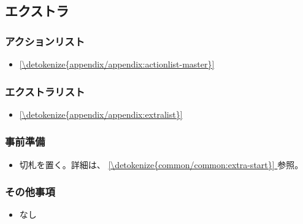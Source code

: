\documentclass[letterpaper,10pt,dvipdfmx]{sphinxmanual}
\begin{document}
\subsection{エクストラ}
\label{\detokenize{format/extra:format-extra}}\label{\detokenize{format/extra:id1}}\label{\detokenize{format/extra::doc}}

\subsubsection{アクションリスト}
\label{\detokenize{format/extra:id2}}\begin{itemize}
\item {} 
\sphinxAtStartPar
\hyperref[\detokenize{appendix/appendix:actionlist-master}]{\ref{\detokenize{appendix/appendix:actionlist-master}} }

\end{itemize}


\subsubsection{エクストラリスト}
\label{\detokenize{format/extra:id3}}\begin{itemize}
\item {} 
\sphinxAtStartPar
\hyperref[\detokenize{appendix/appendix:extralist}]{\ref{\detokenize{appendix/appendix:extralist}} }

\end{itemize}


\subsubsection{事前準備}
\label{\detokenize{format/extra:id4}}\begin{itemize}
\item {} 
\sphinxAtStartPar
切札を置く。詳細は、 \hyperref[\detokenize{common/common:extra-start}]{\ref{\detokenize{common/common:extra-start}} } 参照。

\end{itemize}


\subsubsection{その他事項}
\label{\detokenize{format/extra:id5}}\begin{itemize}
\item {} 
\sphinxAtStartPar
なし

\end{itemize}
\end{document}
